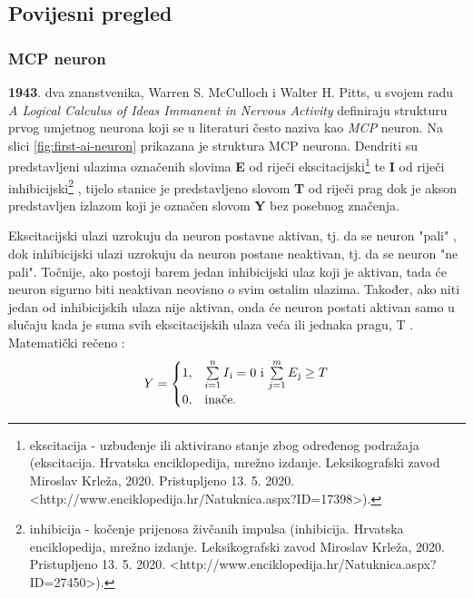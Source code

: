 \documentclass[times, utf8, zavrsni]{fer}
\begin{document}
\subsection{Povijesni pregled}

\subsubsection{MCP neuron}

\textbf{1943}. dva znanstvenika, Warren S. McCulloch i Walter H. Pitts, u svojem radu \textit{A Logical Calculus of Ideas Immanent in Nervous Activity} definiraju strukturu prvog umjetnog neurona koji se u literaturi često naziva kao \textit{MCP} neuron. Na slici \ref{fig:first-ai-neuron} prikazana je struktura MCP neurona. Dendriti su predstavljeni ulazima označenih slovima \textbf{E} od riječi ekscitacijski\footnote{ekscitacija - uzbuđenje ili aktivirano stanje zbog određenog podražaja (ekscitacija. Hrvatska enciklopedija, mrežno izdanje. Leksikografski zavod Miroslav Krleža, 2020. Pristupljeno 13. 5. 2020. <http://www.enciklopedija.hr/Natuknica.aspx?ID=17398>).}  te \textbf{I} od riječi inhibicijski\footnote{inhibicija - kočenje prijenosa živčanih impulsa (inhibicija. Hrvatska enciklopedija, mrežno izdanje. Leksikografski zavod Miroslav Krleža, 2020. Pristupljeno 13. 5. 2020. <http://www.enciklopedija.hr/Natuknica.aspx?ID=27450>).} , tijelo stanice je predstavljeno slovom \textbf{T} od riječi prag  dok je akson predstavljen izlazom koji je označen slovom \textbf{Y} bez posebnog značenja.

Ekscitacijski ulazi uzrokuju da neuron postavne aktivan, tj. da se neuron "pali" , dok inhibicijski ulazi uzrokuju da neuron postane neaktivan, tj. da se neuron "ne pali". Točnije, ako postoji barem jedan inhibicijski ulaz koji je aktivan, tada će neuron sigurno biti neaktivan neovisno o svim ostalim ulazima. Također, ako niti jedan od inhibicijskih ulaza nije aktivan, onda će neuron postati aktivan samo u slučaju kada je suma svih ekscitacijskih ulaza veća ili jednaka pragu, T \citep{McCullPits}. Matematički rečeno \citep{picton2000}:
\begin{equation}
\label{mcp:eq}
    Y = 
    \begin{cases}
        1, & \text{$\sum\limits_{i=1}^n I\textsubscript{i} = 0$ i $\sum\limits_{j=1}^m E\textsubscript{j} \geq T$} \\
        0, & \text{inače.}
    \end{cases}
\end{equation}
\end{document}
